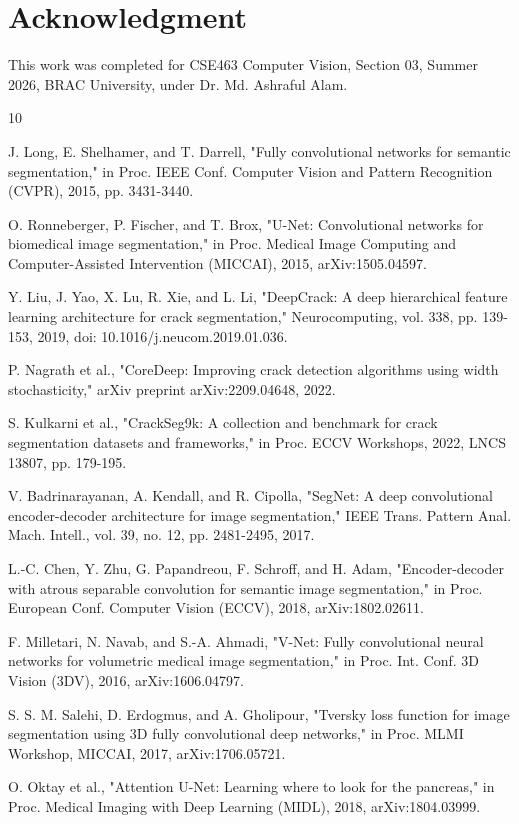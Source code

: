 \documentclass[conference]{IEEEtran}
\begin{document}
\section*{Acknowledgment}
This work was completed for CSE463 Computer Vision, Section 03, Summer 2026, BRAC University, under Dr. Md. Ashraful Alam.

\begin{thebibliography}{10}

J. Long, E. Shelhamer, and T. Darrell, "Fully convolutional networks for semantic segmentation," in Proc. IEEE Conf. Computer Vision and Pattern Recognition (CVPR), 2015, pp. 3431-3440.

O. Ronneberger, P. Fischer, and T. Brox, "U-Net: Convolutional networks for biomedical image segmentation," in Proc. Medical Image Computing and Computer-Assisted Intervention (MICCAI), 2015, arXiv:1505.04597.

Y. Liu, J. Yao, X. Lu, R. Xie, and L. Li, "DeepCrack: A deep hierarchical feature learning architecture for crack segmentation," Neurocomputing, vol. 338, pp. 139-153, 2019, doi: 10.1016/j.neucom.2019.01.036.

P. Nagrath et al., "CoreDeep: Improving crack detection algorithms using width stochasticity," arXiv preprint arXiv:2209.04648, 2022.

S. Kulkarni et al., "CrackSeg9k: A collection and benchmark for crack segmentation datasets and frameworks," in Proc. ECCV Workshops, 2022, LNCS 13807, pp. 179-195.

V. Badrinarayanan, A. Kendall, and R. Cipolla, "SegNet: A deep convolutional encoder-decoder architecture for image segmentation," IEEE Trans. Pattern Anal. Mach. Intell., vol. 39, no. 12, pp. 2481-2495, 2017.

L.-C. Chen, Y. Zhu, G. Papandreou, F. Schroff, and H. Adam, "Encoder-decoder with atrous separable convolution for semantic image segmentation," in Proc. European Conf. Computer Vision (ECCV), 2018, arXiv:1802.02611.

F. Milletari, N. Navab, and S.-A. Ahmadi, "V-Net: Fully convolutional neural networks for volumetric medical image segmentation," in Proc. Int. Conf. 3D Vision (3DV), 2016, arXiv:1606.04797.

S. S. M. Salehi, D. Erdogmus, and A. Gholipour, "Tversky loss function for image segmentation using 3D fully convolutional deep networks," in Proc. MLMI Workshop, MICCAI, 2017, arXiv:1706.05721.

O. Oktay et al., "Attention U-Net: Learning where to look for the pancreas," in Proc. Medical Imaging with Deep Learning (MIDL), 2018, arXiv:1804.03999.

\end{thebibliography}
\end{document}
